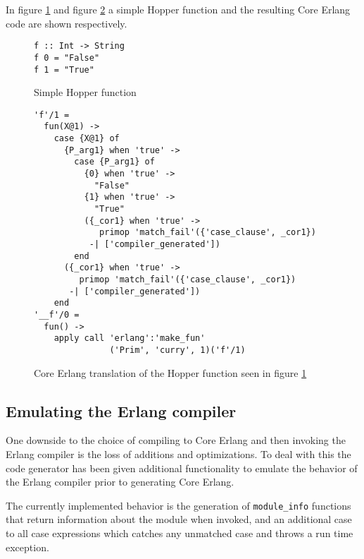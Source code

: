 In figure \ref{lst:hopperFun} and figure \ref{lst:coreFun} a simple Hopper function and the resulting Core Erlang code are shown respectively.

\begin{figure}[!htb]
\centering
\begin{minipage}[b]{0.38\linewidth}
\centering
\begin{lstlisting}
f :: Int -> String
f 0 = "False"
f 1 = "True"
\end{lstlisting}
\end{minipage}
\caption{Simple Hopper function}
\label{lst:hopperFun}
\end{figure}

\begin{figure}[!htb]
\centering
\begin{lstlisting}
'f'/1 =
  fun(X@1) ->
    case {X@1} of
      {P_arg1} when 'true' ->
        case {P_arg1} of
          {0} when 'true' ->
            "False"
          {1} when 'true' ->
            "True"
          ({_cor1} when 'true' ->
             primop 'match_fail'({'case_clause', _cor1})
           -| ['compiler_generated'])
        end
      ({_cor1} when 'true' ->
         primop 'match_fail'({'case_clause', _cor1})
       -| ['compiler_generated'])
    end
'__f'/0 =
  fun() ->
    apply call 'erlang':'make_fun'
               ('Prim', 'curry', 1)('f'/1)
\end{lstlisting}
\caption[Generated Core Erlang translation of function]
 {Core Erlang translation of the Hopper function seen in figure \ref{lst:hopperFun}}
\label{lst:coreFun}
\end{figure}

\subsection{Emulating the Erlang compiler}

One downside to the choice of compiling to Core Erlang and then invoking the Erlang compiler is the loss of additions and optimizations. To deal with this the code generator has been given additional functionality to emulate the behavior of the Erlang compiler prior to generating Core Erlang. 

The currently implemented behavior is the generation of \texttt{module\_info} functions that return information about the module when invoked, and an additional case to all case expressions which catches any unmatched case and throws a run time exception.
